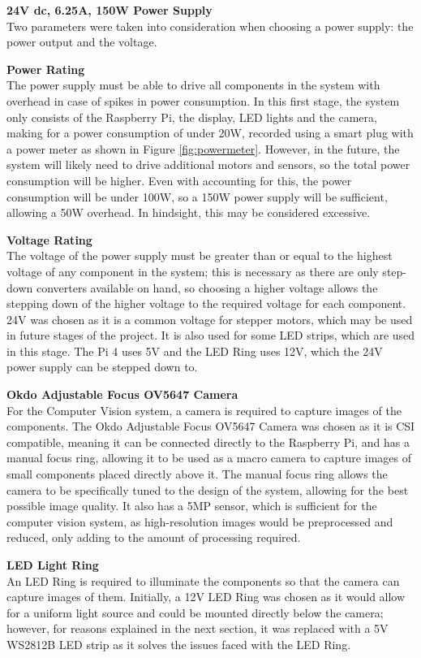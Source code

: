 \vspace{1em}
\noindent
\textbf{24V dc, 6.25A, 150W Power Supply} \\
Two parameters were taken into consideration when choosing a power supply: the power output and the voltage.
\begin{mylist}
  \item \textbf{Power Rating} \\
  The power supply must be able to drive all components in the system with overhead in case of spikes in power consumption.
  In this first stage, the system only consists of the Raspberry Pi, the display, LED lights and the camera, 
  making for a power consumption of under 20W, recorded using a smart plug with a power meter as shown in Figure \ref*{fig:powermeter}.
  However, in the future, the system will likely need to drive additional motors and sensors, so the total power consumption
  will be higher. Even with accounting for this, the power consumption will be under 100W, so a 150W power supply will be sufficient,
  allowing a 50W overhead. In hindsight, this may be considered excessive.
  \item \textbf{Voltage Rating} \\
  The voltage of the power supply must be greater than or equal to the highest voltage of any component in the system; this is necessary
  as there are only step-down converters available on hand, so choosing a higher voltage allows the stepping down of the higher voltage 
  to the required voltage for each component. 24V was chosen as it is a common voltage for stepper motors, which may be used in
  future stages of the project. It is also used for some LED strips, which are used in this stage. The Pi 4 uses 5V and the LED Ring
  uses 12V, which the 24V power supply can be stepped down to.
\end{mylist}

\noindent
\textbf{Okdo Adjustable Focus OV5647 Camera} \\
For the Computer Vision system, a camera is required to capture images of the components. The Okdo Adjustable Focus OV5647 Camera
was chosen as it is CSI compatible, meaning it can be connected directly to the Raspberry Pi, and has a manual focus ring, allowing
it to be used as a macro camera to capture images of small components placed directly above it. The manual focus ring allows the camera
to be specifically tuned to the design of the system, allowing for the best possible image quality. It also
has a 5MP sensor\cite{okdospec}, which is sufficient for the computer vision system, as high-resolution images would be preprocessed and reduced,
only adding to the amount of processing required.

\vspace{1em}
\noindent
\textbf{LED Light Ring} \\
An LED Ring is required to illuminate the components so that the camera can capture images of them.
Initially, a 12V LED Ring was chosen as it would allow for a uniform light source and could be mounted directly below the camera; 
however, for reasons explained in the next section, it was replaced with a 5V WS2812B LED strip as it solves the issues
faced with the LED Ring.

